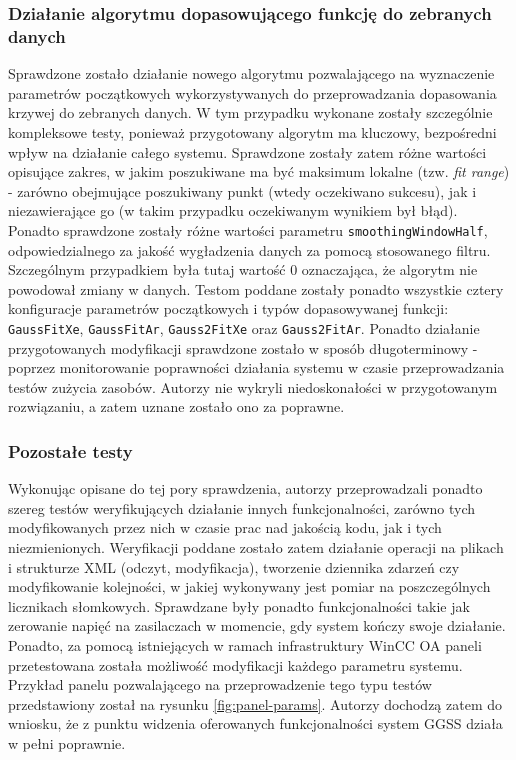 \subsubsection*{Działanie algorytmu dopasowującego funkcję do zebranych danych}
Sprawdzone zostało działanie nowego algorytmu pozwalającego na wyznaczenie parametrów początkowych wykorzystywanych do przeprowadzania dopasowania krzywej do zebranych danych. W tym przypadku wykonane zostały szczególnie kompleksowe testy, ponieważ przygotowany algorytm ma kluczowy, bezpośredni wpływ na działanie całego systemu. Sprawdzone zostały zatem różne wartości opisujące zakres, w jakim poszukiwane ma być maksimum lokalne (tzw. \emph{fit range}) - zarówno obejmujące poszukiwany punkt (wtedy oczekiwano sukcesu), jak i niezawierające go (w takim przypadku oczekiwanym wynikiem był błąd). Ponadto sprawdzone zostały różne wartości parametru \lstinline{smoothingWindowHalf}, odpowiedzialnego za jakość wygładzenia danych za pomocą stosowanego filtru. Szczególnym przypadkiem była tutaj wartość 0 oznaczająca, że algorytm nie powodował zmiany w danych. Testom poddane zostały ponadto wszystkie cztery konfiguracje parametrów początkowych i typów dopasowywanej funkcji: \lstinline{GaussFitXe}, \lstinline{GaussFitAr}, \lstinline{Gauss2FitXe} oraz \lstinline{Gauss2FitAr}. Ponadto działanie przygotowanych modyfikacji sprawdzone zostało w sposób długoterminowy - poprzez monitorowanie poprawności działania systemu w czasie przeprowadzania testów zużycia zasobów. Autorzy nie wykryli niedoskonałości w przygotowanym rozwiązaniu, a zatem uznane zostało ono za poprawne.

\subsubsection*{Pozostałe testy}
Wykonując opisane do tej pory sprawdzenia, autorzy przeprowadzali ponadto szereg testów weryfikujących działanie innych funkcjonalności, zarówno tych modyfikowanych przez nich w czasie prac nad jakością kodu, jak i tych niezmienionych. Weryfikacji poddane zostało zatem działanie operacji na plikach i strukturze XML (odczyt, modyfikacja), tworzenie dziennika zdarzeń czy modyfikowanie kolejności, w jakiej wykonywany jest pomiar na poszczególnych licznikach słomkowych. Sprawdzane były ponadto funkcjonalności takie jak zerowanie napięć na zasilaczach w momencie, gdy system kończy swoje działanie. Ponadto, za pomocą istniejących w ramach infrastruktury WinCC OA paneli przetestowana została możliwość modyfikacji każdego parametru systemu. Przykład panelu pozwalającego na przeprowadzenie tego typu testów przedstawiony został na rysunku \ref{fig:panel-params}. Autorzy dochodzą zatem do wniosku, że z punktu widzenia oferowanych funkcjonalności system GGSS działa w pełni poprawnie.

